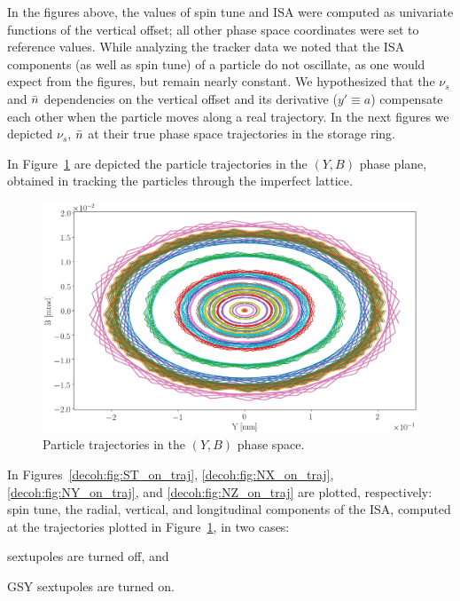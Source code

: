 In the figures above, the values of spin tune and ISA were computed as univariate functions
of the vertical offset; all other phase space coordinates were set to reference values. While analyzing
the tracker data we noted that the ISA components (as well as spin tune) of a particle do not oscillate,
as one would expect from the figures, but remain nearly constant. We hypothesized that the $\nu_s$ and $\bar n$
dependencies on the vertical offset and its derivative ($y'\equiv a$) compensate each other when the particle
moves along a real trajectory. In the next figures we depicted $\nu_s$, $\bar n$ at their true phase space
trajectories in the storage ring.

In Figure~\ref{decoh:fig:yb_traj} are depicted the particle trajectories in the $(Y,B)$ phase plane,
obtained in tracking the particles through the imperfect lattice.
\begin{figure}[h!]
	\centering
	\includegraphics[width=\linewidth]{images/decoh_sim/YB-PHASE_SPACE_IMPERFECT_UNOPT}
	\caption{Particle trajectories in the $(Y,B)$ phase space.\label{decoh:fig:yb_traj}} 
\end{figure}

In Figures~\ref{decoh:fig:ST_on_traj}, \ref{decoh:fig:NX_on_traj}, \ref{decoh:fig:NY_on_traj}, and
\ref{decoh:fig:NZ_on_traj} are plotted, respectively: spin tune, the radial, vertical, and longitudinal
components of the ISA, computed at the trajectories plotted in Figure~\ref{decoh:fig:yb_traj}, in two cases:
\begin{enumerate*}[(1)]
	\item sextupoles are turned off, and 
	\item GSY sextupoles are turned on.
\end{enumerate*}  


